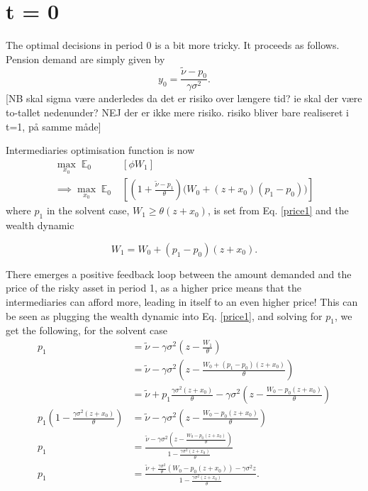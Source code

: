 \documentclass[11pt]{article}
\DeclareMathOperator{\E}{\mathbb{E}} %
\begin{document}
\section*{t = 0}

The optimal decisions in period 0 is a bit more tricky. It proceeds as follows. Pension demand are simply given by 
\begin{equation}
y_0 = \frac{\tilde{\nu} - p_0}{\gamma \sigma^2}.
\end{equation}
[NB skal sigma være anderledes da det er risiko over længere tid? ie skal der være to-tallet nedenunder? NEJ der er ikke mere risiko. risiko bliver bare realiseret i t=1, på samme måde]

Intermediaries optimisation function is now
\begin{equation}
\begin{split}
\max_{x_0} \E_0&[\phi W_1]\\
\implies \max_{x_0} \E_0&\left[\left(1 + \frac{\tilde{\nu} - p_1}{\theta}\right)\bigg(W_0 + \left(z+x_0\right)\left(p_1 - p_0\right) \bigg)  \right]
\end{split}
\end{equation}
where $p_1$ in the solvent case, $W_1 \geq \theta(z+x_0)$, is set from Eq. \ref{price1} and the wealth dynamic 

\begin{equation}
W_1 = W_0 + (p_1-p_0)(z+x_0).
\end{equation}

There emerges a positive feedback loop between the amount demanded and the price of the risky asset in period 1, as a higher price means that the intermediaries can afford more, leading in itself to an even higher price! This can be seen as plugging the wealth dynamic into Eq. \ref{price1}, and solving for $p_1$, we get the following, for the solvent case 
\begin{equation}
\begin{split}
p_1 &= \tilde{\nu} - \gamma \sigma^2(z - \frac{W_1}{\theta})\\
    &= \tilde{\nu} - \gamma \sigma^2(z - \frac{W_0+ (p_1-p_0)(z+x_0)}{\theta})\\
    &= \tilde{\nu} + p_1\frac{\gamma\sigma^2(z+x_0)}{\theta} - \gamma \sigma^2(z - \frac{W_0 - p_0(z+x_0)}{\theta})\\
p_1(1 - \frac{\gamma\sigma^2(z+x_0)}{\theta})    &= \tilde{\nu} - \gamma \sigma^2(z - \frac{W_0 - p_0(z+x_0)}{\theta})\\
p_1   &= \frac{\tilde{\nu} - \gamma \sigma^2(z - \frac{W_0 - p_0(z+x_0)}{\theta})}{1 - \frac{\gamma\sigma^2(z+x_0)}{\theta}}\\
p_1   &= \frac{\tilde{\nu} + \frac{\gamma \sigma^2}{\theta}(W_0 - p_0(z+x_0)) - \gamma \sigma^2z}{1 - \frac{\gamma\sigma^2(z+x_0)}{\theta}}.\\
\end{split}
\end{equation}
\end{document}
